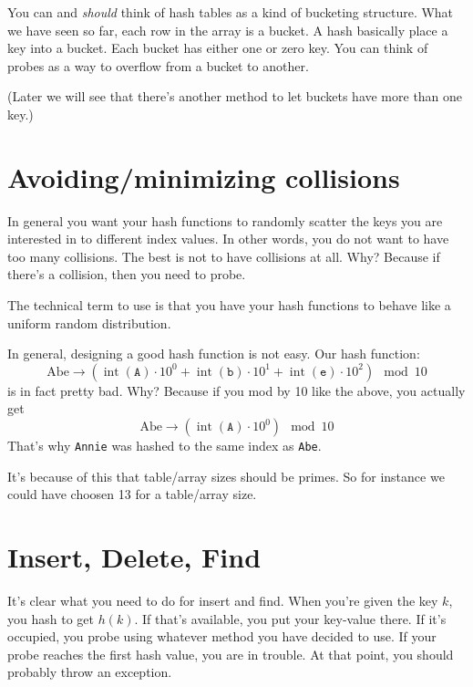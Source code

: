 You can and \textit{should} think of hash tables
as a kind of bucketing structure.
What we have seen so far, each row in the array is a bucket.
A hash basically place a key into a bucket.
Each bucket has either one or zero key.
You can think of probes as a way to overflow from a bucket to another.

(Later we will see that there's another method to let buckets
have more than one key.)




\newpage
\section{Avoiding/minimizing collisions}

In general you want your hash functions to randomly
scatter the keys you are interested in to different index values.
In other words, you do not want to have too many collisions.
The best is not to have collisions at all.
Why?
Because if there's a collision, then you need to probe.

The technical term to use is that you have your
hash functions to behave like a uniform random distribution.

In general, designing a good hash function is not easy.
Our hash function:
\[
\text{Abe}
\rightarrow
(\operatorname{int}(\texttt{A}) \cdot 10^0 +
\operatorname{int}(\texttt{b}) \cdot 10^1 +
\operatorname{int}(\texttt{e}) \cdot 10^2) 
\mod 10
\]
is in fact pretty bad.
Why?
Because if you mod by 10 like the above, you actually get
\[
\text{Abe}
\rightarrow
(\operatorname{int}(\texttt{A}) \cdot 10^0)
\mod 10
\]
That's why \verb!Annie! was hashed to the same index as \verb!Abe!.

It's because of this that table/array sizes should be primes.
So for instance we 
could have choosen 13 for a table/array size.




\newpage
\section{Insert, Delete, Find}

It's clear what you need to do for insert and find.
When you're given the key $k$, you hash to get $h(k)$.
If that's available, you put your key-value there.
If it's occupied, you probe using whatever method you have decided to use.
If your probe reaches the first hash value, you are in trouble.
At that point, you should probably throw an exception.

